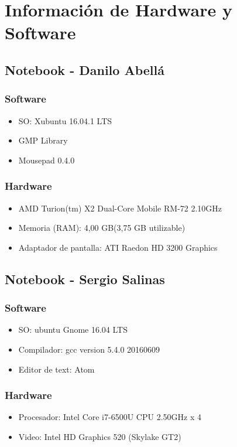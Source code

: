 \documentclass[12pt,letterpaper]{scrartcl}
\begin{document}
\newpage
\section{Información de Hardware y Software}


\subsection{ Notebook - Danilo Abellá}
\subsubsection{Software}
\begin{itemize}
\item SO: Xubuntu 16.04.1 LTS
\item GMP Library
\item Mousepad 0.4.0
\end{itemize}

\subsubsection{Hardware}
\begin{itemize}
\item AMD Turion(tm) X2 Dual-Core Mobile RM-72 2.10GHz
\item Memoria (RAM): 4,00 GB(3,75 GB utilizable)
\item Adaptador de pantalla: ATI Raedon HD 3200 Graphics
\end{itemize}




\subsection{Notebook - Sergio Salinas}
\subsubsection{Software}
\begin{itemize}
\item  SO: ubuntu Gnome 16.04 LTS
\item Compilador: gcc version 5.4.0 20160609 
\item Editor de text: Atom
\end{itemize}

\subsubsection{Hardware}
\begin{itemize}
\item Procesador: Intel Core i7-6500U CPU  2.50GHz x 4 
\item Video: Intel HD Graphics 520 (Skylake GT2) 
\end{itemize}
\end{document}
